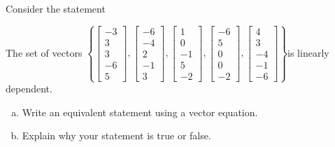 
\begin{exerciseStatement}


Consider the statement 
\begin{center}\begin{minipage}{0.8\textwidth}
 The set of vectors \( \left\{ \left[\begin{array}{c}
-3 \\
3 \\
3 \\
-6 \\
5
\end{array}\right] , \left[\begin{array}{c}
-6 \\
-4 \\
2 \\
-1 \\
3
\end{array}\right] , \left[\begin{array}{c}
1 \\
0 \\
-1 \\
5 \\
-2
\end{array}\right] , \left[\begin{array}{c}
-6 \\
5 \\
0 \\
0 \\
-2
\end{array}\right] , \left[\begin{array}{c}
4 \\
3 \\
-4 \\
-1 \\
-6
\end{array}\right] \right\} \)is linearly dependent.
\end{minipage}\end{center}
    


\begin{enumerate}[(a)]
\item  Write an equivalent statement using a vector equation.
\item  Explain why your statement is true or false.
\end{enumerate}
    
\end{exerciseStatement}
    
